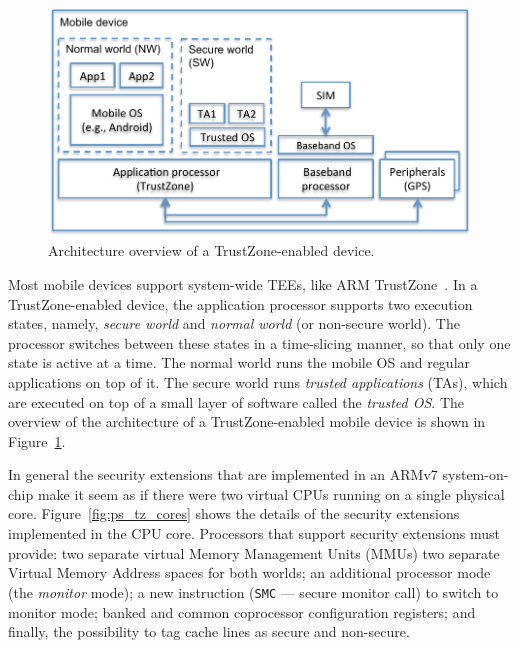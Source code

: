 \begin{figure}[!ht]
    \centering
    \includegraphics[width=.9\linewidth]{figures/phonesecures/tee_mobile}
    \caption[Architecture overview of a TrustZone-enabled device]{Architecture overview of a TrustZone-enabled device.}
    \label{fig:ps_tee_mobile}
\end{figure}

Most mobile devices support system-wide TEEs, like ARM
TrustZone~\cite{ARMTrustZone}. In a TrustZone-enabled device, the application
processor supports two execution states, namely, \emph{secure world} and
\emph{normal world} (or non-secure world). The processor switches between these
states in a time-slicing manner, so that only one state is active at a time.
The normal world runs the mobile OS and regular applications on top of it. The
secure world runs \emph{trusted applications} (TAs), which are executed on top
of a small layer of software called the \emph{trusted OS}. The overview of the
architecture of a TrustZone-enabled mobile device is shown in
Figure~\ref{fig:ps_tee_mobile}.

In general the security extensions that are implemented in an ARMv7 system-on-chip make it seem as if there were two virtual CPUs running on a single physical core. Figure~\ref{fig:ps_tz_cores} shows the details of the security extensions implemented in the CPU core. Processors that support security extensions must provide: two separate virtual Memory Management Units (MMUs) two separate Virtual Memory Address spaces for both worlds; an additional processor mode (the \emph{monitor} mode); a new instruction (\texttt{SMC} --- secure monitor call) to switch to monitor mode; banked and common coprocessor configuration registers; and finally, the possibility to tag cache lines as secure and non-secure.

